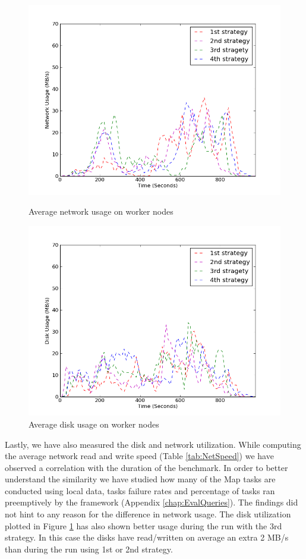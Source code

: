 \documentclass[11pt,a4paper,twoside]{report}
\begin{document}
\begin{figure}[ht]
\begin{minipage}[b]{0.47\linewidth}
\centering
\includegraphics[scale=0.36]{avg-net-w}
\caption{Average network usage on worker nodes}
\label{fig:AvgNetW}
\end{minipage}
\hspace{0.2cm}
\begin{minipage}[b]{0.5\linewidth}
\centering
\includegraphics[scale=0.36]{avg-dsk-w}
\caption{Average disk usage on worker nodes}
\label{fig:AvgDskW}
\end{minipage}
\end{figure}

Lastly, we have also measured the disk and network utilization. While computing the average network read and write speed (Table \ref{tab:NetSpeed}) we have observed a correlation with the duration of the benchmark. In order to better understand the similarity we have studied how many of the Map tasks are conducted using local data, tasks failure rates and percentage of tasks ran preemptively by the framework (Appendix \ref{chap:EvalQueries}). The findings did not hint to any reason for the difference in network usage. The disk utilization plotted in Figure \ref{fig:AvgDskW} has also shown better usage during the run with the 3rd strategy. In this case the disks have read/written on average an extra 2 MB/s than during the run using 1st or 2nd strategy.
\end{document}
